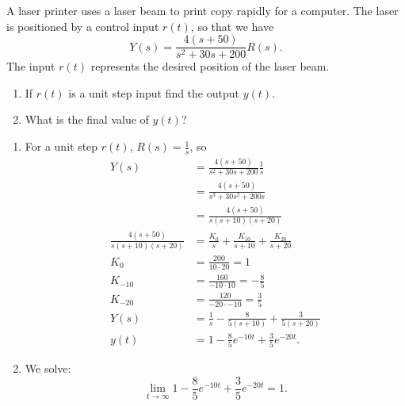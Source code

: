 \begin{exa}
  A laser printer uses a laser beam to print copy rapidly for a computer. The laser is positioned by a control input $r(t)$, so that we have
  \begin{equation*}
    Y(s) = \frac{4(s+50)}{s^2 + 30s + 200}R(s)
  .\end{equation*}
  The input $r(t)$ represents the desired position of the laser beam.
  \begin{enumerate}[label=(\alph*)]
    \item If $r(t)$ is a unit step input find the output $y(t)$.
    \item What is the final value of $y(t)$?
  \end{enumerate}
  \tcblower
  \begin{enumerate}[label=(\alph*)]
    \item   For a unit step $r(t)$, $R(s) = \frac{1}{s}$, so
  \begin{align*}
    Y(s) &= \frac{4(s+50)}{s^2 + 30s + 200} \frac{1}{s} \\
    &= \frac{4(s+50)}{s^3 + 30s^2 + 200s} \\
    &= \frac{4(s+50)}{s (s+10)(s+20)} \\
    \frac{4(s+50)}{s(s+10)(s+20)} &= \frac{K_{0}}{s} + \frac{K_{10}}{s+10} + \frac{K_{20}}{s+20} \\
    K_{0} &= \frac{200}{10 \cdot 20} = 1 \\
    K_{-10} &= \frac{160}{-10 \cdot 10} = - \frac{8}{5} \\
    K_{-20} &= \frac{120}{-20 \cdot -10} = \frac{3}{5} \\
    Y(s) &= \frac{1}{s} - \frac{8}{5(s+10)} + \frac{3}{5(s+20)} \\
    y(t) &= 1 - \frac{8}{5}e^{-10t} + \frac{3}{5} e^{-20t}
  .\end{align*}
  \item We solve:
    \begin{equation*}
      \lim_{t \to \infty} 1 - \frac{8}{5} e^{-10t} + \frac{3}{5} e^{-20t} = 1
    .\end{equation*}
  \end{enumerate}
\end{exa}
